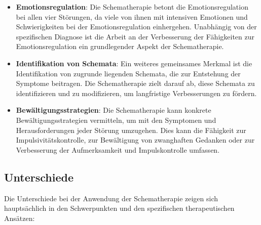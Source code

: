 \begin{itemize}
  \item \textbf{Emotionsregulation}: Die Schematherapie betont die Emotionsregulation bei allen vier Störungen, da viele von ihnen mit intensiven Emotionen und Schwierigkeiten bei der Emotionsregulation einhergehen. Unabhängig von der spezifischen Diagnose ist die Arbeit an der Verbesserung der Fähigkeiten zur Emotionsregulation ein grundlegender Aspekt der Schematherapie.
  
  \item \textbf{Identifikation von Schemata}: Ein weiteres gemeinsames Merkmal ist die Identifikation von zugrunde liegenden Schemata, die zur Entstehung der Symptome beitragen. Die Schematherapie zielt darauf ab, diese Schemata zu identifizieren und zu modifizieren, um langfristige Verbesserungen zu fördern.
  
  \item \textbf{Bewältigungsstrategien}: Die Schematherapie kann konkrete Bewältigungsstrategien vermitteln, um mit den Symptomen und Herausforderungen jeder Störung umzugehen. Dies kann die Fähigkeit zur Impulsivitätskontrolle, zur Bewältigung von zwanghaften Gedanken oder zur Verbesserung der Aufmerksamkeit und Impulskontrolle umfassen.
\end{itemize}

\subsection{Unterschiede}

Die Unterschiede bei der Anwendung der Schematherapie zeigen sich hauptsächlich in den Schwerpunkten und den spezifischen therapeutischen Ansätzen:

